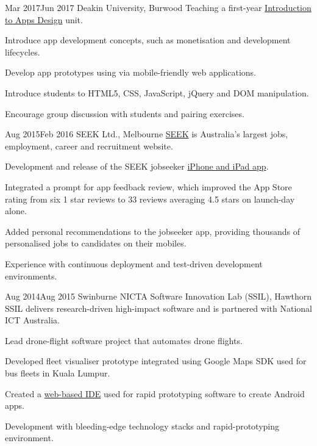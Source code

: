{Mar 2017}{Jun 2017}
{Deakin University, Burwood}
{Teaching a first-year \href{http://www.deakin.edu.au/current-students-courses/unit.php?unit=SIT120}{Introduction to Apps Design} unit.}
{
  \item Introduce app development concepts, such as monetisation and development lifecycles.
  \item Develop app prototypes using via mobile-friendly web applications.
  \item Introduce students to HTML5, CSS, JavaScript, jQuery and DOM manipulation.
  \item Encourage group discussion with students and pairing exercises.
}

\clearpage

{Aug 2015}{Feb 2016}
{SEEK Ltd., Melbourne}
{\href{http://seek.com.au}{SEEK} is Australia's largest jobs, employment, career and recruitment website.}
{
  \item Development and release of the SEEK jobseeker \href{https://itunes.apple.com/us/app/seek-jobs/id520400855?mt=8}{iPhone and iPad app}.
  \item Integrated a prompt for app feedback review, which improved the App Store rating from six 1 star reviews to 33 reviews averaging 4.5 stars on launch-day alone.
  \item Added personal recommendations to the jobseeker app, providing thousands of personalised jobs to candidates on their mobiles.
  \item Experience with continuous deployment and test-driven development environments.
}

{Aug 2014}{Aug 2015}
{Swinburne NICTA Software Innovation Lab (SSIL), Hawthorn}
{SSIL delivers research-driven high-impact software and is partnered with National ICT Australia.}
{
  \item Lead drone-flight software project that automates drone flights.
  \item Developed fleet visualiser prototype integrated using Google Maps SDK used for bus fleets in Kuala Lumpur.
  \item Created a \href{http://rappt.io/}{web-based IDE} used for rapid prototyping software to create Android apps.
  \item Development with bleeding-edge technology stacks and rapid-prototyping environment.
}

